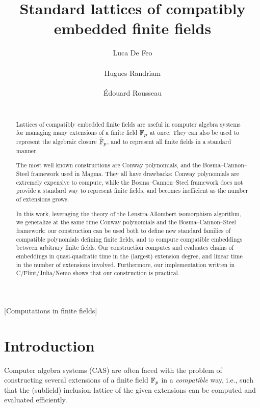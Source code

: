 \documentclass{sig-alternate}
\author{
  \alignauthor Luca De Feo\\
  \affaddr{Universit\'e Paris Saclay -- UVSQ, LMV}\\
  \email{luca.de-feo@uvsq.fr}
  \alignauthor Hugues Randriam\\
  \affaddr{LTCI, T\'el\'ecom ParisTech}\\
  \email{randriam@enst.fr}
  \alignauthor \'Edouard Rousseau\\
  \affaddr{LTCI, T\'el\'ecom ParisTech,\\
    Universit\'e Paris Saclay -- UVSQ, LMV}\\
  \email{erousseau@enst.fr}
}
\title{Standard lattices of compatibly embedded finite fields}
\begin{document}
\maketitle

\begin{abstract}
  Lattices of compatibly embedded finite fields are useful in computer
  algebra systems for managing many extensions of a finite field
  $\mathbb{F}_p$ at once. %
  They can also be used to represent the algebraic closure $\bar{\mathbb{F}}_p$,
  and to represent all finite fields in a standard manner.

  The most well known constructions are Conway polynomials, and the
  Bosma--Cannon--Steel framework used in Magma. %
  They all have drawbacks: Conway polynomials are extremely expensive
  to compute, while the Bosma--Cannon--Steel framework does not provide
  a standard way to represent finite fields, and becomes inefficient
  as the number of extensions grows.

  In this work, leveraging the theory of the Lenstra-Allombert
  isomorphism algorithm, we generalize at the same time Conway
  polynomials and the Bosma--Cannon--Steel framework: our construction
  can be used both to define new standard families of compatible
  polynomials defining finite fields, and to compute compatible
  embeddings between arbitrary finite fields. %
  Our construction computes and evaluates chains of embeddings in
  quasi-quadratic time in the (largest) extension degree, and linear
  time in the number of extensions involved. %
  Furthermore, our implementation written in C/Flint/Julia/Nemo shows
  that our construction is practical.
\end{abstract}

[Computations in finite fields]

\section{Introduction}
\label{sec:introduction}

Computer algebra systems (CAS) are often faced with the problem of
constructing several extensions of a finite field $\mathbb{F}_p$ in a
\emph{compatible} way, i.e., such that the (subfield) inclusion
lattice of the given extensions can be computed and evaluated
efficiently.
\end{document}
